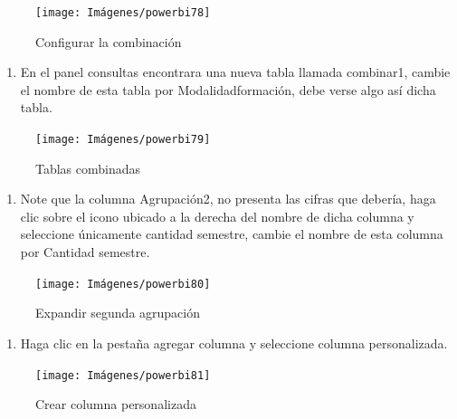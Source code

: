 \documentclass[
]{book}
\providecommand{\tightlist}{%
  \setlength{\itemsep}{0pt}\setlength{\parskip}{0pt}}
\begin{document}
\begin{figure}

{\centering \texttt{[image: Imágenes/powerbi78]} 

}

\caption{Configurar la combinación}\label{fig:paso9porcentajes-fig}
\end{figure}

\begin{enumerate}
\def\labelenumi{\arabic{enumi}.}
\setcounter{enumi}{9}
\tightlist
\item
  En el panel consultas encontrara una nueva tabla llamada combinar1, cambie el nombre de esta tabla por Modalidadformación, debe verse algo así dicha tabla.
\end{enumerate}

\begin{figure}

{\centering \texttt{[image: Imágenes/powerbi79]} 

}

\caption{Tablas combinadas}\label{fig:paso10porcentajes-fig}
\end{figure}

\begin{enumerate}
\def\labelenumi{\arabic{enumi}.}
\setcounter{enumi}{10}
\tightlist
\item
  Note que la columna Agrupación2, no presenta las cifras que debería, haga clic sobre el icono ubicado a la derecha del nombre de dicha columna y seleccione únicamente cantidad semestre, cambie el nombre de esta columna por Cantidad semestre.
\end{enumerate}

\begin{figure}

{\centering \texttt{[image: Imágenes/powerbi80]} 

}

\caption{Expandir segunda agrupación}\label{fig:paso11porcentajes-fig}
\end{figure}

\begin{enumerate}
\def\labelenumi{\arabic{enumi}.}
\setcounter{enumi}{11}
\tightlist
\item
  Haga clic en la pestaña agregar columna y seleccione columna personalizada.
\end{enumerate}

\begin{figure}

{\centering \texttt{[image: Imágenes/powerbi81]} 

}

\caption{Crear columna personalizada}\label{fig:paso12porcentajes-fig}
\end{figure}
\end{document}

